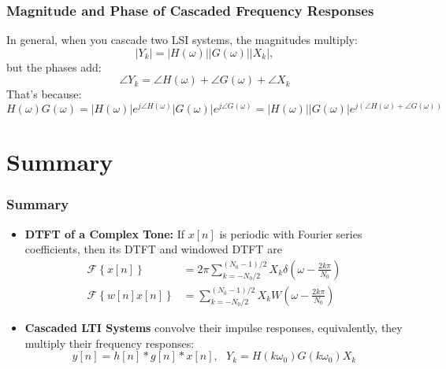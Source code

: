 \documentclass{beamer}
\begin{document}
\begin{frame}
  \frametitle{Magnitude and Phase of Cascaded Frequency Responses}

  In general, when you cascade two LSI systems, the magnitudes multiply:
  \[
  |Y_k|=|H(\omega)||G(\omega)||X_k|,
  \]
  but the phases add:
  \[
  \angle Y_k = \angle H(\omega)+\angle G(\omega)+\angle X_k
  \]
  That's because:
  \[
  H(\omega)G(\omega)=|H(\omega)|e^{j\angle H(\omega)}|G(\omega)|e^{j\angle G(\omega)}
  =|H(\omega)||G(\omega)| e^{j\left(\angle H(\omega)+\angle G(\omega)\right)}
  \]
\end{frame}


\section[Summary]{Summary}
\setcounter{subsection}{1}

\begin{frame}
  \frametitle{Summary}
  \begin{itemize}
  \item {\bf DTFT of a Complex Tone:}
    If $x[n]$ is periodic with Fourier series coefficients, then its DTFT and windowed DTFT are
    \begin{align*}
      \mathcal{F}\left\{x[n]\right\}
      &=2\pi\sum_{k=-N_0/2}^{(N_0-1)/2} X_k \delta\left(\omega-\frac{2k\pi}{N_0}\right)\\
      \mathcal{F}\left\{w[n]x[n]\right\}
      &=\sum_{k=-N_0/2}^{(N_0-1)/2} X_k W\left(\omega-\frac{2k\pi}{N_0}\right)
    \end{align*}
  \item {\bf Cascaded LTI Systems} convolve their impulse responses, equivalently, they
    multiply their frequency responses:
    \[
    y[n]=h[n]\ast g[n]\ast x[n],~~~Y_k=H(k\omega_0)G(k\omega_0)X_k
    \]
  \end{itemize}
\end{frame}
\end{document}
